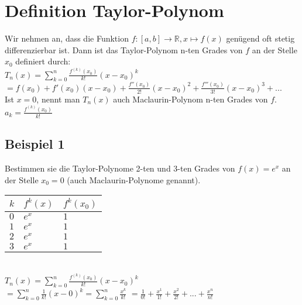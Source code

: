 \documentclass[../main.tex]{subfiles}
\begin{document}
\section{Definition Taylor-Polynom}
Wir nehmen an, dass die Funktion $f:[a,b]\to\mathbb{R},x\mapsto f(x)$ genügend oft stetig
differenzierbar ist. Dann ist das Taylor-Polynom n-ten Grades von $f$ an der Stelle $x_0$ definiert durch: \\ [7pt]
$T_n(x)=\sum\limits_{k=0}^n\frac{f^{(k)}(x_0)}{k!}(x-x_0)^k$ \\ [7pt]
$=f(x_0)+f'(x_0)(x-x_0)+\frac{f''(x_0)}{2!}(x-x_0)^2+\frac{f'''(x_0)}{3!}(x-x_0)^3+... $\\
Ist $x=0$, nennt man $T_n(x)$ auch Maclaurin-Polynom n-ten Grades von $f$. \\
$a_k = \frac{f^{(k)}(x_0)}{k!}$

\subsection{Beispiel 1}
Bestimmen sie die Taylor-Polynome 2-ten und 3-ten Grades von $f(x)=e^x$ an der Stelle
$x_0=0$ (auch Maclaurin-Polynome genannt). \\
\begin{tabularx}{0.8\textwidth} { 
    >{\centering\arraybackslash}X
    >{\centering\arraybackslash}X 
    >{\centering\arraybackslash}X  }
    $k$ & $f^k(x)$ & $f^k(x_0)$
    \\ [7pt]
    \hline
    $0$ & $e^x$ & $1$
    \\ [7pt]
    $1$ & $e^x$ & $1$
    \\ [7pt]
    $2$ & $e^x$ & $1$
    \\ [7pt]
    $3$ & $e^x$ & $1$
    \\ [7pt]
\end{tabularx}
\\
$T_n(x)=\sum\limits_{k=0}^n\frac{f^{(k)}(x_0)}{k!}(x-x_0)^k$ \\ [7pt]
$= \sum\limits_{k=0}^n\frac{1}{k!}(x-0)^k = \sum\limits_{k=0}^n\frac{x^k}{k!}$
$= \frac{1}{0!}+\frac{x^1}{1!}+\frac{x^2}{2!}+...+\frac{x^n}{n!}$
\end{document}
